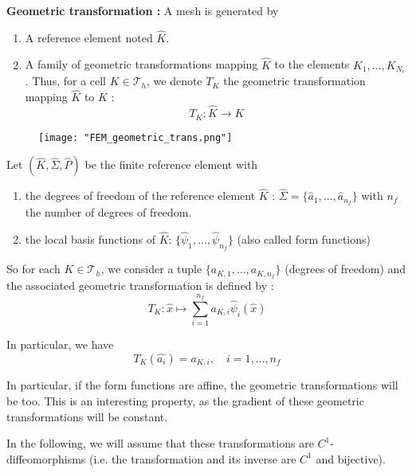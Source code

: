 \textbf{Geometric transformation :}
A mesh is generated by
\begin{enumerate}[label=\textbullet]
	\item A reference element noted $\hat{K}$.
	\item A family of geometric transformations mapping $\hat{K}$ to the elements $K_1,\dots,K_{N_e}$. Thus, for a cell $K\in\mathcal{T}_h$, we denote $T_K$ the geometric transformation mapping $\hat{K}$ to $K$ :
	\begin{equation*}
	T_K : \hat{K}\rightarrow K
	\end{equation*}
\end{enumerate}

\begin{figure}[H]
	\centering
	\texttt{[image: "FEM\_geometric\_trans.png"]}
	\label{trans_geo}
\end{figure}

Let $(\hat{K},\hat{\Sigma},\hat{P})$ be the finite reference element with 
\begin{enumerate}[label=\textbullet]
	\item the degrees of freedom of the reference element $\hat{K}$ : $\hat{\Sigma}=\{\hat{a}_1,\dots,\hat{a}_{n_f}\}$ with $n_f$ the number of degrees of freedom.
	\item the local basis functions of $\hat{K}$: $\{\hat{\psi}_1,\dots,\hat{\psi}_{n_f}\}$ (also called form functions)
\end{enumerate}

So for each $K\in\mathcal{T}_h$, we consider a tuple $\{a_{K,1},\dots,a_{K,n_f}\}$ (degrees of freedom) and the associated geometric transformation is defined by :
\begin{equation*}
	T_K : \hat{x}\mapsto\sum_{i=1}^{n_f}a_{K,i}\hat{\psi}_i(\hat{x})
\end{equation*}

In particular, we have
\begin{equation*}
	T_K(\hat{a_i})=a_{K,i}, \quad i=1,\dots,n_f
\end{equation*}

\begin{Rem}
	In particular, if the form functions are affine, the geometric transformations will be too. This is an interesting property, as the gradient of these geometric transformations will be constant.
\end{Rem}

\begin{Rem}
	In the following, we will assume that these transformations are $C^1$-diffeomorphisms (i.e. the transformation and its inverse are $C^1$ and bijective).
\end{Rem}

